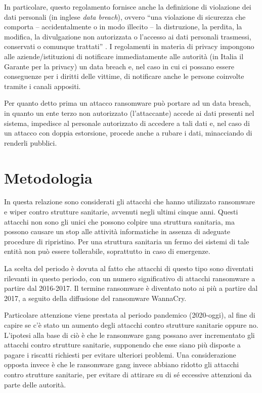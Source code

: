 \documentclass[12pt]{article}
\begin{document}
In particolare, questo regolamento fornisce anche la definizione di violazione dei dati personali (in inglese \textit{data breach}), ovvero ``una violazione di sicurezza che comporta – accidentalmente o in modo illecito – la distruzione, la perdita, la modifica, la divulgazione non autorizzata o l’accesso ai dati personali trasmessi, conservati o comunque trattati'' \cite{noauthor_data_2022}. I regolamenti in materia di privacy impongono alle aziende/istituzioni di notificare immediatamente alle autorità (in Italia il Garante per la privacy) un data breach e, nel caso in cui ci possano essere conseguenze per i diritti delle vittime, di notificare anche le persone coinvolte tramite i canali appositi.

Per quanto detto prima un attacco ransomware può portare ad un data breach, in quanto un ente terzo non autorizzato (l'attaccante) accede ai dati presenti nel sistema, impedisce al personale autorizzato di accedere a tali dati e, nel caso di un attacco con doppia estorsione, procede anche a rubare i dati, minacciando di renderli pubblici.

\section{Metodologia}

In questa relazione sono considerati gli attacchi che hanno utilizzato ransomware e wiper contro strutture sanitarie, avvenuti negli ultimi cinque anni. Questi attacchi non sono gli unici che possono colpire una struttura sanitaria, ma possono causare un stop alle attività informatiche in assenza di adeguate procedure di ripristino. Per una struttura sanitaria un fermo dei sistemi di tale entità non può essere tollerabile, soprattutto in caso di emergenze.

La scelta del periodo è dovuta al fatto che attacchi di questo tipo sono diventati rilevanti in questo periodo, con un numero significativo di attacchi ransomware a partire dal 2016-2017. Il termine ransomware è diventato noto ai più a partire dal 2017, a seguito della diffusione del ransomware WannaCry.

Particolare attenzione viene prestata al periodo pandemico (2020-oggi), al fine di capire se c'è stato un aumento degli attacchi contro strutture sanitarie oppure no. L'ipotesi alla base di ciò è che le ransomware gang possano aver incrementato gli attacchi contro strutture sanitarie, supponendo che esse siano più disposte a pagare i riscatti richiesti per evitare ulteriori problemi. Una considerazione opposta invece è che le ransomware gang invece abbiano ridotto gli attacchi contro strutture sanitarie, per evitare di attirare su di sé eccessive attenzioni da parte delle autorità.
\end{document}
